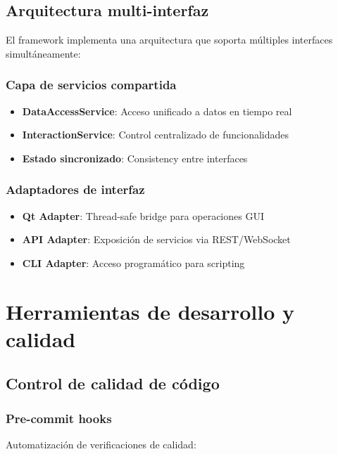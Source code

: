 \begin{itemize}
\subsection{Arquitectura multi-interfaz}
\label{subsec:arquitectura_multi_interfaz}

El framework implementa una arquitectura que soporta múltiples interfaces simultáneamente:

\subsubsection{Capa de servicios compartida}
\begin{itemize}
    \item \textbf{DataAccessService}: Acceso unificado a datos en tiempo real
    \item \textbf{InteractionService}: Control centralizado de funcionalidades
    \item \textbf{Estado sincronizado}: Consistency entre interfaces
\end{itemize}

\subsubsection{Adaptadores de interfaz}
\begin{itemize}
    \item \textbf{Qt Adapter}: Thread-safe bridge para operaciones GUI
    \item \textbf{API Adapter}: Exposición de servicios via REST/WebSocket
    \item \textbf{CLI Adapter}: Acceso programático para scripting
\end{itemize}

\section{Herramientas de desarrollo y calidad}
\label{sec:herramientas_desarrollo}

\subsection{Control de calidad de código}
\label{subsec:control_calidad}

\subsubsection{Pre-commit hooks}
Automatización de verificaciones de calidad:


\end{itemize}
